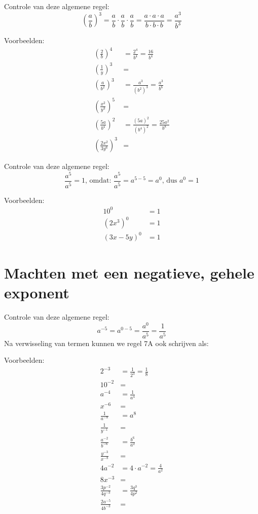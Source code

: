
Controle van deze algemene regel:
\[
\left(\frac{a}{b}\right)^3 = \frac{a}{b} \cdot \frac{a}{b} \cdot \frac{a}{b} 
                           = \frac{a \cdot a \cdot a}{b \cdot b \cdot b} 
                           = \frac{a^3}{b^3}
\]

Voorbeelden:
\begin{align*}
\left(\frac{2}{b}\right)^4       &= \frac{2^4}{b^4} = \frac{16}{b^4} \\
\left(\frac{1}{y}\right)^3       &= \\
\left(\frac{a}{b^2}\right)^3     &= \frac{a^3}{(b^2)^3} = \frac{a^3}{b^6} \\
\left(\frac{x^2}{y^3}\right)^5   &= \\
\left(\frac{5a}{b^4}\right)^2    &= \frac{(5a)^2}{(b^4)^2} = \frac{25a^2}{b^8} \\
\left(\frac{2x^2}{3y^6}\right)^3 &=
\end{align*}

Controle van deze algemene regel: 
\[
    \frac{a^5}{a^5} =1 \text{, omdat: } \frac{a^5}{a^5} =a^{5-5}=a^0 \text{, dus } a^0=1
\]

Voorbeelden:
\begin{align*}
10^0        &= 1 \\
(2x^3)^0    &= 1 \\
(3x - 5y)^0 &= 1
\end{align*}

\section{Machten met een negatieve, gehele exponent}

Controle van deze algemene regel:
\[
    a^{-5}=a^{0-5}=\frac{a^0}{a^5} =\frac{1}{a^5}
\]
Na verwisseling van termen kunnen we regel 7A ook schrijven als:

\newpage
{} 

Voorbeelden:
\begin{align*}
2^{-3}  &= \frac{1}{2^3} = \frac{1}{8} \\[1em]
10^{-2} &= \\[1em]
a^{-4}  &= \frac{1}{a^4} \\[1em]
x^{-6}  &= \\[1em]
\frac{1}{a^{-8}}        &= a^8 \\[1em]
\frac{1}{y^{-1}}        &= \\[1em]
\frac{a^{-2}}{b^{-6}}   &= \frac{b^6}{a^2} \\[1em]
\frac{y^{-3}}{x^{-8}}   &= \\[1em]
4a^{-2}                 &= 4 \cdot a^{-2} = \frac{4}{a^2} \\[1em]
8x^{-3}                 &= \\[1em]
\frac{3p^{-2}}{4q^{-3}} &= \frac{3q^3}{4p^2} \\[1em]
\frac{2a^{-5}}{4b^{-3}} &=
\end{align*}

